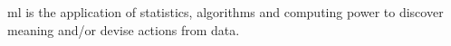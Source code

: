 \gls{ml} is the application of statistics, algorithms and computing power to discover meaning and/or devise actions from data.
